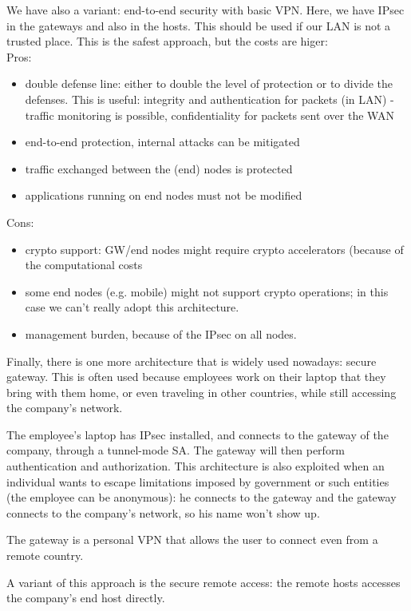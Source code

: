 We have also a variant: end-to-end security with basic VPN. Here, we have IPsec in the gateways and also in the hosts. This should be used if our LAN is not a trusted place. This is the safest approach, but the costs are higer:\\
Pros:
\begin{itemize}
    \item double defense line: either to double the level of protection or to divide the defenses. This is useful: integrity and authentication for packets (in LAN) - traffic monitoring is possible, confidentiality for packets sent over the WAN
    \item end-to-end protection, internal attacks can be mitigated
    \item traffic exchanged between the (end) nodes is protected
    \item applications running on end nodes must not be modified
\end{itemize}
Cons:
\begin{itemize}
    \item crypto support: GW/end nodes might require crypto accelerators (because of the computational costs
    \item some end nodes (e.g. mobile) might not support crypto operations; in this case we can't really adopt this architecture.
    \item management burden, because of the IPsec on all nodes.
\end{itemize}

Finally, there is one more architecture that is widely used nowadays: secure gateway. This is often used because employees work on their laptop that they bring with them home, or even traveling in other countries, while still accessing the company's network.

The employee's laptop has IPsec installed, and connects to the gateway of the company, through a tunnel-mode SA. The gateway will then perform authentication and authorization. This architecture is also exploited when an individual wants to escape limitations imposed by government or such entities (the employee can be anonymous): he connects to the gateway and the gateway connects to the company's network, so his name won't show up.

The gateway is a personal VPN that allows the user to connect even from a remote country.

A variant of this approach is the secure remote access: the remote hosts accesses the company's end host directly.

